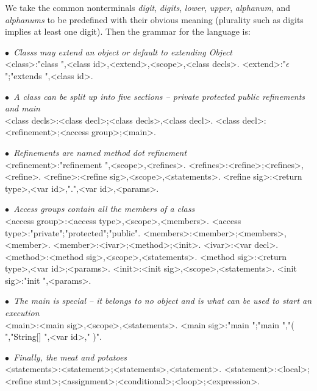 We take the common nonterminals \emph{digit}, \emph{digits}, \emph{lower}, \emph{upper}, \emph{alphanum}, and \emph{alphanums} to be predefined with their obvious meaning (plurality such as digits implies at least one digit). Then the grammar for the language is:

\newcommand{\comment}[1]{{\escapegrammar$\bullet$\it\ #1}\\}

\begin{grammar}

\comment{Classs may extend an object or default to extending Object}
<class>:"class ",<class id>,<extend>,<scope>,<class decls>.
<extend>:"$\epsilon$";"extends ",<class id>.

\comment{A class can be split up into five sections -- private protected public refinements and main}
<class decls>:<class decl>;<class decls>,<class decl>.
<class decl>:<refinement>;<access group>;<main>.

\comment{Refinements are named method dot refinement}
<refinement>:"refinement ",<scope>,<refines>.
<refines>:<refine>;<refines>,<refine>.
<refine>:<refine sig>,<scope>,<statements>.
<refine sig>:<return type>,<var id>,".",<var id>,<params>.

\comment{Access groups contain all the members of a class}
<access group>:<access type>,<scope>,<members>.
<access type>:"private";"protected";"public".
<members>:<member>;<members>,<member>.
<member>:<ivar>;<method>;<init>.
<ivar>:<var decl>.
<method>:<method sig>,<scope>,<statements>.
<method sig>:<return type>,<var id>;<params>.
<init>:<init sig>,<scope>,<statements>.
<init sig>:"init ",<params>.

\comment{The main is special -- it belongs to no object and is what can be used to start an execution}
<main>:<main sig>,<scope>,<statements>.
<main sig>:"main ";"main ","( ","String[] ",<var id>," )".

\comment{Finally, the meat and potatoes}
<statements>:<statement>;<statements>,<statement>.
<statement>:<local>;<refine stmt>;<assignment>;<conditional>;<loop>;<expression>.


\end{grammar}
